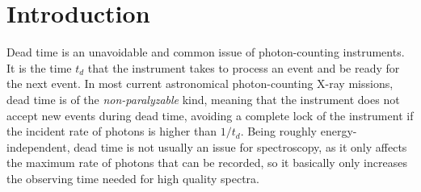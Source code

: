 \documentclass[twocolumn]{aastex61}
\newcommand{\deadt}{\ensuremath{t_d}\xspace}
\begin{document}




\section{Introduction} \label{sec:intro}
Dead time is an unavoidable and common issue of photon-counting instruments.
It is the time $\deadt$ that the instrument takes to process an event and be ready for the next event.
In most current astronomical photon-counting X-ray missions, dead time is of the \textit{non-paralyzable} kind, meaning that the instrument does not accept new events during dead time, avoiding a complete lock of the instrument if the incident rate of photons is higher than $1/\deadt$.
Being roughly energy-independent, dead time is not usually an issue for spectroscopy, as it only affects the maximum rate of photons that can be recorded, so it basically only increases the observing time needed for high quality spectra.
\end{document}
